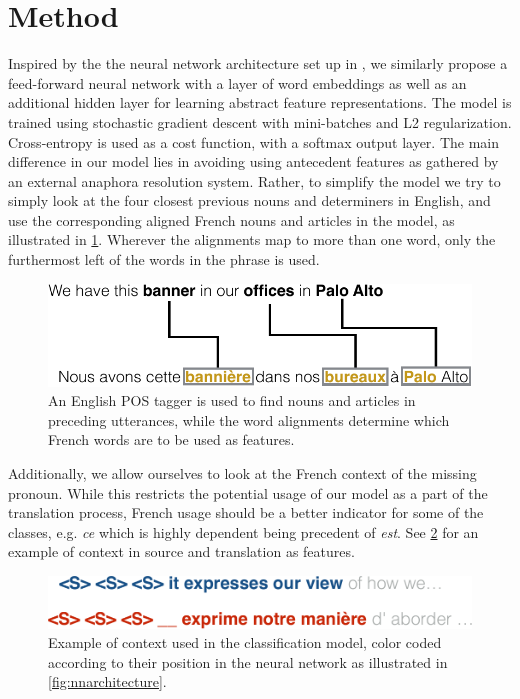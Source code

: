 \documentclass[11pt]{article}
\begin{document}
\section{Method}

Inspired by the the neural network architecture set up in \textcite{Hardmeier2013Latent}, we similarly propose a feed-forward neural network with a layer of word embeddings as well as an additional hidden layer for learning abstract feature representations.
The model is trained using stochastic gradient descent with mini-batches and L2 regularization.
Cross-entropy is used as a cost function, with a softmax output layer.
The main difference in our model lies in avoiding using antecedent features as gathered by an external anaphora resolution system.
Rather, to simplify the model we try to simply look at the four closest previous nouns and determiners in English, and use the corresponding aligned French nouns and articles in the model, as illustrated in \cref{fig:posexample}.
Wherever the alignments map to more than one word, only the furthermost left of the words in the phrase is used.

\begin{figure}[htbp]
    \centering
    \includegraphics[width=\columnwidth]{figures/posexample.pdf}
    \caption{An English POS tagger is used to find nouns and articles in preceding utterances, while the word alignments determine which French words are to be used as features.}
    \label{fig:posexample}
\end{figure}


Additionally, we allow ourselves to look at the French context of the missing pronoun.
While this restricts the potential usage of our model as a part of the translation process, French usage should be a better indicator for some of the classes, e.g. \emph{ce} which is highly dependent being precedent of \emph{est}.
See \cref{fig:contextexample} for an example of context in source and translation as features.

\begin{figure}[htbp]
    \centering
    \includegraphics[width=\columnwidth]{figures/contextexample.pdf}
    \caption{Example of context used in the classification model, color coded according to their position in the neural network as illustrated in \cref{fig:nnarchitecture}.}
    \label{fig:contextexample}
\end{figure}
\end{document}

